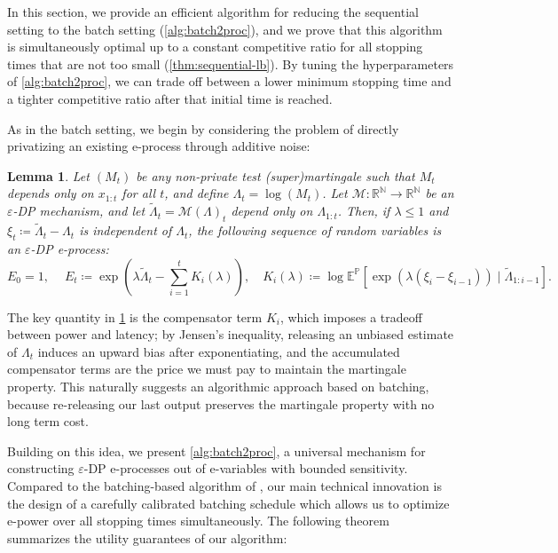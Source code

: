 \documentclass{article}
\newcommand{\Null}{\mathbb{P}}
\newcommand{\M}{\mathcal{M}}
\newcommand{\eps}{\varepsilon}
\newtheorem{lemma}{Lemma}[theorem]
\begin{document}
In this section, we provide an efficient algorithm for reducing the sequential setting to the batch setting (\cref{alg:batch2proc}), and we prove that this algorithm is simultaneously optimal up to a constant competitive ratio for all stopping times that are not too small (\cref{thm:sequential-lb}). By tuning the hyperparameters of \cref{alg:batch2proc}, we can trade off between a lower minimum stopping time and a tighter competitive ratio after that initial time is reached.

As in the batch setting, we begin by considering the problem of directly privatizing an existing e-process through additive noise:

\begin{lemma}\label{lem:ind-martingale}
    Let $(M_t)$ be any non-private test (super)martingale such that $M_t$ depends only on $x_{1:t}$ for all $t$, and define $\Lambda_t = \log(M_t)$. Let $\M: \mathbb{R}^\mathbb{N} \to \mathbb{R}^\mathbb{N}$ be an $\eps$-DP mechanism, and let $\tilde \Lambda_t = \M(\Lambda)_t$ depend only on $\Lambda_{1:t}$. Then, if $\lambda \leq 1$ and $\xi_t \coloneq \tilde \Lambda_t - \Lambda_t$ is independent of $\Lambda_t$, the following sequence of random variables is an $\eps$-DP e-process:
    \begin{equation*}
    E_0 = 1,
    \quad ~E_t \coloneq \exp\left( \lambda \tilde \Lambda_t - \sum_{i=1}^t K_i(\lambda) \right), 
    \quad K_i(\lambda) \coloneq \log \mathbb{E}^\Null[\exp(\lambda (\xi_i - \xi_{i-1})) \mid \tilde \Lambda_{1:i-1}].
    \end{equation*}

\end{lemma}


The key quantity in \cref{lem:ind-martingale} is the compensator term $K_i$, which imposes a tradeoff between power and latency; by Jensen's inequality, releasing an unbiased estimate of $\Lambda_t$ induces an upward bias after exponentiating, and the accumulated compensator terms are the price we must pay to maintain the martingale property. This naturally suggests an algorithmic approach based on batching, because re-releasing our last output preserves the martingale property with no long term cost. 

Building on this idea, we present \cref{alg:batch2proc}, a universal mechanism for constructing $\varepsilon$-DP e-processes out of e-variables with bounded sensitivity. Compared to the batching-based algorithm of \citet{csillagDifferentiallyPrivateEValues2025a}, our main technical innovation is the design of a carefully calibrated batching schedule which allows us to optimize e-power over all stopping times simultaneously. The following theorem summarizes the utility guarantees of our algorithm:
\end{document}
